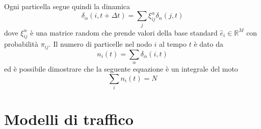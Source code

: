 \documentclass[../main.tex]{subfiles}
\begin{document}
\\Ogni particella segue quindi la dinamica
\begin{equation}
    \delta_\alpha(i,t+\Delta t)=\sum_j\xi_{ij}^\alpha\delta_\alpha(j,t)
\end{equation}
dove $\xi_{ij}^\alpha$ è una matrice random che prende valori della base standard $\widehat{e}_i\in \mathbb{R}^M$ con probabilità $\pi_{ij}$.
Il numero di particelle nel nodo $i$ al tempo $t$ è dato da
\begin{equation}
    n_i(t)=\sum_\alpha\delta_\alpha(i,t)
\end{equation}
ed è possibile dimostrare \cite{RandomWalks} che la seguente equazione è un integrale del moto
\begin{equation}
    \sum_in_i(t)=N
\end{equation}

\section{Modelli di traffico}
\end{document}
